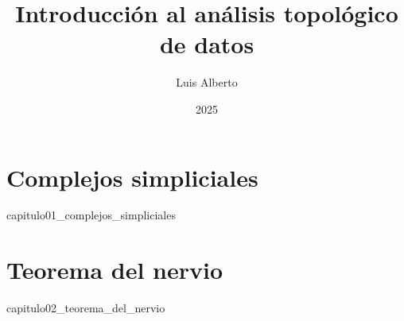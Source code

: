 \documentclass[12pt,oneside]{book}
\theoremstyle{definition}
\begin{document}
\author{Luis Alberto}
\title{Introducción al análisis topológico de datos}
\date{2025}

\frontmatter
\maketitle
\tableofcontents

\mainmatter
\chapter{Complejos simpliciales}
\label{ch:simplicial_complexes}
{capitulo01_complejos_simpliciales}

\chapter{Teorema del nervio}
\label{ch:nerve_thm}
{capitulo02_teorema_del_nervio}

\backmatter


\end{document}
